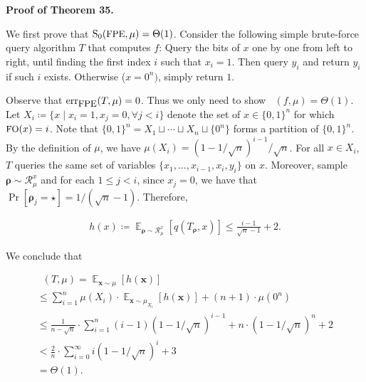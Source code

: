 \documentclass[10pt,a4paper]{article}
\begin{document}
\par\medskip\noindent\textbf{Proof of Theorem 35.}\par




We first prove that ${\textup{S}}_{0}({\textrm{\small{FPE}}},\mu)=\Theta(1)$.
Consider the following simple brute-force query algorithm $T$ that computes $f$: Query the bits of $x$ one by one from left to right, until finding the first index $i$ such that $x_{i}=1$. Then query $y_{i}$ and return $y_{i}$ if such $i$ exists. Otherwise ($x=0^{n})$, simply return $1$.\par




Observe that $\mathrm{err}_{\textrm{\small{FPE}}}(T,\mu)=0$.
Thus we only need to show $\mathop{\overline{sq}}(f,\mu)=\Theta(1)$.
Let $X_{i}\coloneqq\{x\mid x_{i}=1,x_{j}=0,\forall j<i\}$ denote the set of $x\in\{0,1\}^{n}$ for which ${\textrm{\small{FO}}}(x)=i$.
Note that $\{0,1\}^{n}=X_{1}\sqcup\cdots\sqcup X_{n}\sqcup\{0^{n}\}$ forms a partition of $\{0,1\}^{n}$.
By the definition of $\mu$, we have $\mu(X_{i})=(1-1/\sqrt{n})^{i-1}/\sqrt{n}$.
For all $x\in X_{i}$, $T$ queries the same set of variables $\{x_{1},\ldots,x_{i-1},x_{i},y_{i}\}$ on $x$.
Moreover, sample $\bm{\rho}\sim\mathcal{R}_{\mu}^{x}$ and for each $1\leq j<i$, since $x_{j}=0$, we have that $\Pr[\bm{\rho}_{j}=\star]=1/(\sqrt{n}-1)$. Therefore,\par


\[\begin{gathered}
h(x)\coloneqq\mathop{\mathbb{E}}\nolimits_{\bm{\rho}\sim\mathcal{R}^{x}_{\mu}}[q(T_{\bm{\rho}},x)]\leq\frac{i-1}{\sqrt{n}-1}+2.
\end{gathered}\]


We conclude that\par


\[\begin{gathered}
\displaystyle\mathop{\overline{sq}}(T,\mu) \displaystyle=\mathop{\mathbb{E}}_{\bm{x}\sim\mu}\left[h(\bm{x})\right] \\
\displaystyle\leq\sum\nolimits_{i=1}^{n}\mu(X_{i})\cdot\mathop{\mathbb{E}}\nolimits_{\bm{x}\sim\mu_{X_{i}}}[h(\bm{x})]+(n+1)\cdot\mu(0^{n}) \\
\displaystyle\leq\frac{1}{n-\sqrt{n}}\cdot\sum\nolimits_{i=1}^{n}(i-1)(1-1/\sqrt{n})^{i-1}+n\cdot(1-1/\sqrt{n})^{n}+2 \\
\displaystyle<\frac{2}{n}\cdot\sum\nolimits_{i=0}^{\infty}i(1-1/\sqrt{n})^{i}+3 \\
\displaystyle=\Theta(1).
\end{gathered}\]
\end{document}

